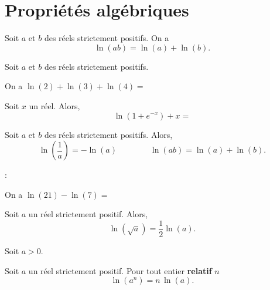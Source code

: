 \documentclass[11pt,fleqn, openany]{book} %
\begin{document}
\section{Propriétés algébriques}

\begin{proposition}Soit $a$ et $b$ des réels strictement positifs. On a
\[\ln (ab)=\ln(a)+\ln (b).\]\vspace{-0.5cm}\end{proposition}

\begin{demonstration}
Soit $a$ et $b$ des réels strictement positifs. 
\vskip50pt
\end{demonstration}

\begin{example}On a $\ln(2)+\ln(3)+\ln(4)=$\end{example}

\begin{example}Soit $x$ un réel. Alors,
\[\ln(1+e^{-x})+x=\]\end{example}

\begin{proposition}Soit $a$ et $b$ des réels strictement positifs. Alors,
\[\ln\left(\dfrac{1}{a}\right)=-\ln(a) \qquad \qquad \ln (ab)=\ln(a)+\ln (b).\]\vspace{-0.5cm}\end{proposition}

\begin{demonstration} :
\vskip40pt
\end{demonstration}

\begin{example}On a $\ln(21)-\ln(7)=$\end{example}

\begin{proposition}Soit $a$ un réel strictement positif. Alors,
\[\ln (\sqrt{a})=\dfrac{1}{2}\ln(a).\]\vspace{-0.5cm}\end{proposition}

\begin{demonstration}Soit $a>0$.

\vskip50pt
\end{demonstration}

\begin{proposition}Soit $a$ un réel strictement positif. Pour tout entier \textbf{relatif} $n$
\[\ln(a^n)=n\,\ln(a).\]\vspace{-0.5cm}\end{proposition}
\end{document}
